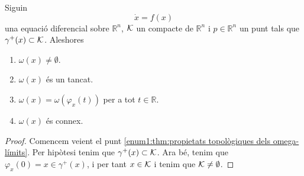 \documentclass[../Apunts.tex]{subfiles}
\begin{document}
	\begin{theorem}
		\label{thm:propietats topològiques dels omega-límits}
		Siguin
		\[\dot{x}=f(x)\]
		una equació diferencial sobre \(\mathbb{R}^{n}\), \(\mathcal{K}\) un compacte de \(\mathbb{R}^{n}\) i \(p\in\mathbb{R}^{n}\) un punt tals que \(\gamma^{+}(x)\subset\mathcal{K}\). Aleshores
		\begin{enumerate}
			\item\label{enum1:thm:propietats topològiques dels omega-límits} \(\omega(x)\neq\emptyset\).
			\item\label{enum2:thm:propietats topològiques dels omega-límits} \(\omega(x)\) és un tancat.
			\item\label{enum3:thm:propietats topològiques dels omega-límits} \(\omega(x)=\omega(\varphi_{x}(t))\) per a tot \(t\in\mathbb{R}\).
			\item\label{enum4:thm:propietats topològiques dels omega-límits} \(\omega(x)\) és connex.
		\end{enumerate}
		\begin{proof}
			Comencem veient el punt \eqref{enum1:thm:propietats topològiques dels omega-límits}. Per hipòtesi tenim que \(\gamma^{+}(x)\subset\mathcal{K}\). Ara bé, tenim que \(\varphi_{x}(0)=x\in\gamma^{+}(x)\), i per tant \(x\in\mathcal{K}\) i tenim que \(\mathcal{K}\neq\emptyset\). %
		\end{proof}
	\end{theorem}
\end{document}
